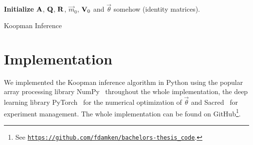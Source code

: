 	\begin{algorithm}  \DontPrintSemicolon
		\textbf{Initialize} \(\boldsymbol{\mathrm{A}}\), \(\boldsymbol{\mathrm{Q}}\), \(\boldsymbol{\mathrm{R}}\), \(\vec{m}_0\), \(\boldsymbol{\mathrm{V}}_0\) and \(\vec{\theta}\) somehow (\eg identity matrices). \;
		\caption{Koopman Inference}
		\label{alg:ngk}
	\end{algorithm}

\section{Implementation}
	\label{sec:implementation}

	We implemented the Koopman inference algorithm in Python using the popular array processing library NumPy~\cite{harrisArrayProgrammingNumPy2020} throughout the whole implementation, the deep learning library PyTorch~\cite{paszkePyTorchImperativeStyle2019} for the numerical optimization of \(\vec{\theta}\) and Sacred~\cite{greffSacredInfrastructureComputational2017} for experiment management. The whole implementation can be found on GitHub\footnote{See \href{https://github.com/fdamken/bachelors-thesis_code}{\texttt{https://github.com/fdamken/bachelors-thesis\_code}}.}.

